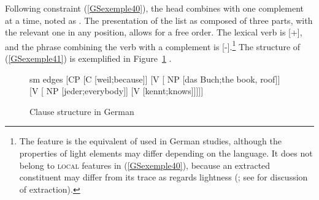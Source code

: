 {\begin{exe}
\end{exe}

Following constraint (\ref{GSexemple40}), the head combines with one complement at a time, noted as
. The presentation of the list as composed of three parts, with the relevant one in any
position, allows for a free order. The lexical verb is [\light +], and the phrase combining the verb
with a complement is [\light -].\footnote{The feature \light is the equivalent of \lex used in German
  studies, although the properties of light elements may differ depending on the language. It does
  not belong to \textsc{local} features in (\ref{GSexemple40}), because an extracted constituent may
  differ from its trace as regards lightness (\citealt{muller2018clause}; see  for discussion of extraction).} The structure of (\ref{GSexemple41}) is exemplified in Figure~\ref{GSfigure10} \citep[22]{muller2018clause}.


\z


\begin{figure}
    \centering
	\begin{forest}
	sm edges
 	[CP 
    [C [weil;because]]
    [V  
        [ NP [das Buch;the book, roof]]    
        [V  
            [ NP [jeder;everybody]]
            [V  [kennt;knows]]]]]
\end{forest}
    \caption{Clause structure in German}
    \label{GSfigure10}
\end{figure}


}
